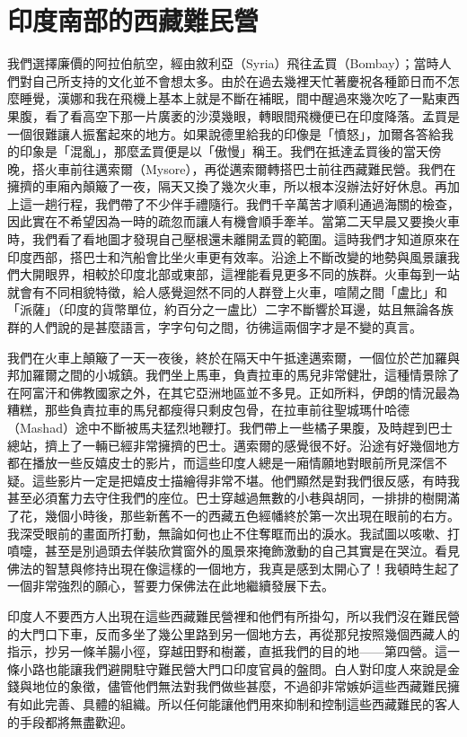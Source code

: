\chapter{印度南部的西藏難民營}

我們選擇廉價的阿拉伯航空，經由敘利亞（Syria）飛往孟買（Bombay）；當時人們對自己所支持的文化並不會想太多。由於在過去幾裡天忙著慶祝各種節日而不怎麼睡覺，漢娜和我在飛機上基本上就是不斷在補眠，間中醒過來幾次吃了一點東西果腹，看了看高空下那一片廣袤的沙漠幾眼，轉眼間飛機便已在印度降落。孟買是一個很難讓人振奮起來的地方。如果說德里給我的印像是「憤怒」，加爾各答給我的印象是「混亂」，那麼孟買便是以「傲慢」稱王。我們在抵達孟買後的當天傍晚，搭火車前往邁索爾（Mysore），再從邁索爾轉搭巴士前往西藏難民營。我們在擁擠的車廂內顛簸了一夜，隔天又換了幾次火車，所以根本沒辦法好好休息。再加上這一趟行程，我們帶了不少伴手禮隨行。我們千辛萬苦才順利通過海關的檢查，因此實在不希望因為一時的疏忽而讓人有機會順手牽羊。當第二天早晨又要換火車時，我們看了看地圖才發現自己壓根還未離開孟買的範圍。這時我們才知道原來在印度西部，搭巴士和汽船會比坐火車更有效率。沿途上不斷改變的地勢與風景讓我們大開眼界，相較於印度北部或東部，這裡能看見更多不同的族群。火車每到一站就會有不同相貌特徵，給人感覺迴然不同的人群登上火車，喧鬧之間「盧比」和「派薩」（印度的貨幣單位，約百分之一盧比）二字不斷響於耳邊，姑且無論各族群的人們說的是甚麼語言，字字句句之間，彷彿這兩個字才是不變的真言。

我們在火車上顛簸了一天一夜後，終於在隔天中午抵達邁索爾，一個位於芒加羅與邦加羅爾之間的小城鎮。我們坐上馬車，負責拉車的馬兒非常健壯，這種情景除了在阿富汗和佛教國家之外，在其它亞洲地區並不多見。正如所料，伊朗的情況最為糟糕，那些負責拉車的馬兒都瘦得只剩皮包骨，在拉車前往聖城瑪什哈德（Mashad）途中不斷被馬夫猛烈地鞭打。我們帶上一些橘子果腹，及時趕到巴士總站，擠上了一輛已經非常擁擠的巴士。邁索爾的感覺很不好。沿途有好幾個地方都在播放一些反嬉皮士的影片，而這些印度人總是一廂情願地對眼前所見深信不疑。這些影片一定是把嬉皮士描繪得非常不堪。他們顯然是對我們很反感，有時我甚至必須奮力去守住我們的座位。巴士穿越過無數的小巷與胡同，一排排的樹開滿了花，幾個小時後，那些新舊不一的西藏五色經幡終於第一次出現在眼前的右方。我深受眼前的畫面所打動，無論如何也止不住奪眶而出的淚水。我試圖以咳嗽、打噴嚏，甚至是別過頭去佯裝欣賞窗外的風景來掩飾激動的自己其實是在哭泣。看見佛法的智慧與修持出現在像這樣的一個地方，我真是感到太開心了！我頓時生起了一個非常強烈的願心，誓要力保佛法在此地繼續發展下去。

印度人不要西方人出現在這些西藏難民營裡和他們有所掛勾，所以我們沒在難民營的大門口下車，反而多坐了幾公里路到另一個地方去，再從那兒按照幾個西藏人的指示，抄另一條羊腸小徑，穿越田野和樹叢，直抵我們的目的地——第四營。這一條小路也能讓我們避開駐守難民營大門口印度官員的盤問。白人對印度人來說是金錢與地位的象徵，儘管他們無法對我們做些甚麼，不過卻非常嫉妒這些西藏難民擁有如此完善、具體的組織。所以任何能讓他們用來抑制和控制這些西藏難民的客人的手段都將無盡歡迎。

